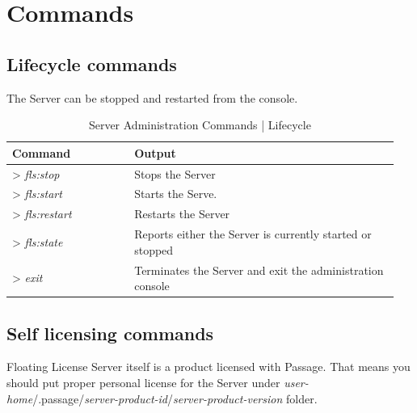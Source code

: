 \documentclass[12pt]{report}
\begin{document}
\section*{Commands} \label{ch:run-fls-commands}

\subsection*{Lifecycle commands} \label{ch:run-fls-commands-lc}
 
The Server can be stopped and restarted from the console. 

\begin{table}[h!t]
\caption{Server Administration Commands | Lifecycle}
\label{tabular:server-commands-lc}
\begin{center}
	\begin{tabular}{p{0.3\linewidth}p{0.65\linewidth}}
		\textbf{Command} & \textbf{Output} \\  \hline
		\textgreater \textit{ fls:stop} & Stops the Server\\  \hline
		\textgreater \textit{ fls:start} & Starts the Serve.\\  \hline
		\textgreater \textit{ fls:restart} & Restarts the Server\\  \hline
		\textgreater \textit{ fls:state} & Reports either the Server is currently started or stopped\\ \hline
		\textgreater \textit{ exit} & Terminates the Server and exit the administration console\\ \hline
	\end{tabular}
\end{center}
\end{table}

\subsection*{Self licensing commands} \label{ch:run-fls-commands-lc}

Floating License Server itself is a product licensed with Passage. 
That means you should put proper personal license for the Server under 
\textit{user-home}/.passage/\textit{server-product-id}/\textit{server-product-version} folder.
\end{document}
